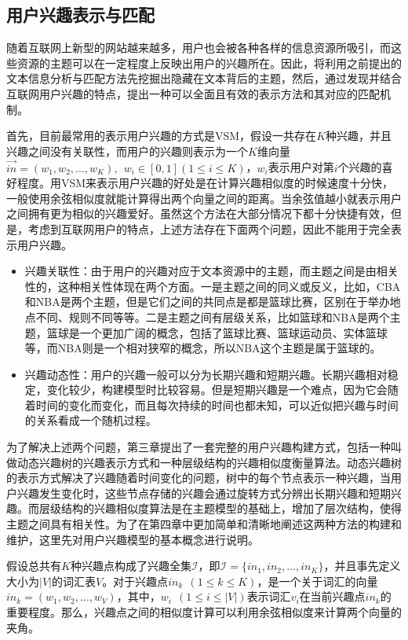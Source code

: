 \subsection{用户兴趣表示与匹配}
随着互联网上新型的网站越来越多，用户也会被各种各样的信息资源所吸引，而这些资源的主题可以在一定程度上反映出用户的兴趣所在。因此，将利用之前提出的文本信息分析与匹配方法先挖掘出隐藏在文本背后的主题，然后，通过发现并结合互联网用户兴趣的特点，提出一种可以全面且有效的表示方法和其对应的匹配机制。

首先，目前最常用的表示用户兴趣的方式是VSM，假设一共存在$K$种兴趣，并且兴趣之间没有关联性，而用户的兴趣则表示为一个$K$维向量$\vec{in}=(w_1,w_2,...,w_K),~~w_i\in [0,1](1\le i\le K)$，$w_i$表示用户对第$i$个兴趣的喜好程度。用VSM来表示用户兴趣的好处是在计算兴趣相似度的时候速度十分快，一般使用余弦相似度就能计算得出两个向量之间的距离。当余弦值越小就表示用户之间拥有更为相似的兴趣爱好。虽然这个方法在大部分情况下都十分快捷有效，但是，考虑到互联网用户的特点，上述方法存在下面两个问题，因此不能用于完全表示用户兴趣。
\begin{itemize}
  \item 兴趣关联性：由于用户的兴趣对应于文本资源中的主题，而主题之间是由相关性的，这种相关性体现在两个方面。一是主题之间的同义或反义，比如，CBA和NBA是两个主题，但是它们之间的共同点是都是篮球比赛，区别在于举办地点不同、规则不同等等。二是主题之间有层级关系，比如篮球和NBA是两个主题，篮球是一个更加广阔的概念，包括了篮球比赛、篮球运动员、实体篮球等，而NBA则是一个相对狭窄的概念，所以NBA这个主题是属于篮球的。
  \item 兴趣动态性：用户的兴趣一般可以分为长期兴趣和短期兴趣。长期兴趣相对稳定，变化较少，构建模型时比较容易。但是短期兴趣是一个难点，因为它会随着时间的变化而变化，而且每次持续的时间也都未知，可以近似把兴趣与时间的关系看成一个随机过程。
\end{itemize}

为了解决上述两个问题，第三章提出了一套完整的用户兴趣构建方式，包括一种叫做动态兴趣树的兴趣表示方式和一种层级结构的兴趣相似度衡量算法。动态兴趣树的表示方式解决了兴趣随着时间变化的问题，树中的每个节点表示一种兴趣，当用户兴趣发生变化时，这些节点存储的兴趣会通过旋转方式分辨出长期兴趣和短期兴趣。而层级结构的兴趣相似度算法是在主题模型的基础上，增加了层次结构，使得主题之间具有相关性。为了在第四章中更加简单和清晰地阐述这两种方法的构建和维护，这里先对用户兴趣模型的基本概念进行说明。

假设总共有$K$种兴趣点构成了兴趣全集$\mathcal{I}$，即$\mathcal{I}=\{in_1,in_2,...,in_K\}$，并且事先定义大小为$|V|$的词汇表$V$。对于兴趣点$in_k~~(1\le k\le K)$，是一个关于词汇的向量$in_k=(w_1,w_2,...,w_V)$，其中，$w_i~~(1\le i\le |V|)$表示词汇$v_i$在当前兴趣点$in_k$的重要程度。那么，兴趣点之间的相似度计算可以利用余弦相似度来计算两个向量的夹角。

